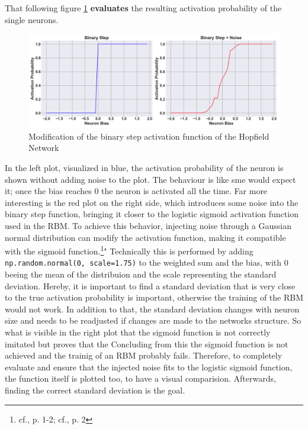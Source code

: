 That following figure \ref{Noisy_acitivation_function_bad} \textbf{evaluates} the resulting activation probability of the single neurons. 
\begin{figure}[H]
    \centering
    \includegraphics[width=1\linewidth]{graphics/combined_noise_activation_plots.png}
    \caption{Modification of the binary step activation function of the Hopfield Network}
    \label{Noisy_acitivation_function_bad}
\end{figure}
In the left plot, visualized in blue, the activation probability of the neuron is shown without adding noise to the plot. 
The behaviour is like sme would expect it; once the bias reaches 0 the neuron is activated all the time.
Far more interesting is the red plot on the right side, which introduces some noise into the binary step function, bringing it closer to the logistic sigmoid activation function used in the \ac{RBM}.
To achieve this behavior, injecting noise through a Gaussian normal distribution can modify the activation function, making it compatible with the sigmoid function.\footnote{cf.\cite{bohmNoiseinjectedAnalogIsing2022}, p. 1-2; cf.\cite{mahmoodiVersatileStochasticDot2019}, p. 2}"
Technically this is performed by adding \texttt{np.random.normal(0, scale=1.75)} to the weighted sum and the bias, with 0 beeing the mean of the distribuion and the scale representing the standard deviation. 
Hereby, it is important to find a standard deviation that is very close to the true activation probability is important, otherwise the training of the RBM would not work.
In addition to that, the standard deviation changes with neuron size and needs to be readjusted if changes are made to the networks structure.
So what is visible in the right plot that the sigmoid function is not correctly imitated but proves that the
Concluding from this the sigmoid function is not achieved and the trainig of an \ac{RBM} probably fails. 
Therefore, to completely evaluate and ensure that the injected noise fits to the logistic sigmoid function, the function itself is plotted 
too, to have a visual comparision. Afterwards, finding the correct standard deviation is the goal. 
